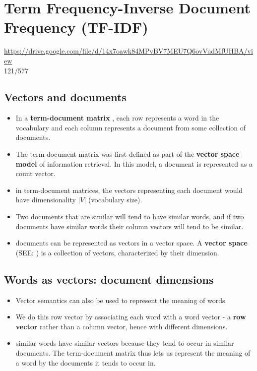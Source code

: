 \chapter{Term Frequency-Inverse Document Frequency (TF-IDF) \cite{nlp-1}} \label{Term Frequancy-Inverse Document Frequency (TF-IDF)}

\url{https://drive.google.com/file/d/14x7oawk84MPvBV7MEU7Q6ovVudMfUHBA/view}\\
121/577

\section{Vectors and documents \cite{nlp-1}}\label{tf-idf: Vectors and documents}

\begin{itemize}
    \item In a \textbf{term-document matrix} \label{term-document matrix}, each row represents a word in the vocabulary and each column represents a document from some collection of documents.
    
    \item The term-document matrix was first defined as part of the \textbf{vector space model}\label{vector space model} of information retrieval. In this model, a document is represented as a count vector.

    \item in term-document matrices, the vectors representing each document would have dimensionality $|V|$ (vocabulary size).

    \item Two documents that are similar will tend to have similar words, and if two documents have similar words their column vectors will tend to be similar.

    \item documents can be represented as vectors in a vector space. A \textbf{vector space} (SEE: ) is a collection of vectors, characterized by their dimension.
\end{itemize}

\section{Words as vectors: document dimensions \cite{nlp-1}}\label{tf-idf: Words as vectors: document dimensions}

\begin{itemize}
    \item Vector semantics can also be used to represent the meaning of words. 

    \item We do this row vector by associating each word with a word vector - a \textbf{row vector} rather than a column vector, hence with different dimensions.

    \item similar words have similar vectors because they tend to occur in similar documents. The term-document matrix thus lets us represent the meaning of a word by the documents it tends to occur in.
\end{itemize}


